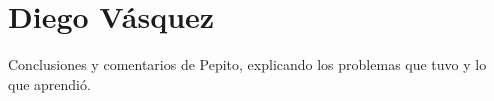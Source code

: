\section{Diego Vásquez}
Conclusiones y comentarios de Pepito, explicando los problemas que tuvo y lo que aprendió.